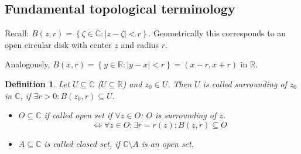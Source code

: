 \documentclass[a4paper,landscape,twocolumn]{article}
\newtheorem{defi}{Definition}
\newcommand\set[1]{\left\{#1\right\}}
\newcommand\abs[1]{\left|#1\right|}
\begin{document}
\subsection{Fundamental topological terminology}
%
Recall: $B(z, r) = \set{\zeta \in \mathbb C: \abs{z - \zeta} < r}$.
Geometrically this corresponds to an open circular disk with center $z$ and radius $r$.

Analogously, $B(x, r) = \set{y \in \mathbb R: \abs{y - x} < r} = (x-r, x+r)$
in $\mathbb R$.

\begin{defi}
  Let $U \subseteq \mathbb C$ ($U \subseteq \mathbb R$) and $z_0 \in U$.
  Then $U$ is called surrounding of $z_0$ in $\mathbb C$,
  if $\exists r > 0: B(z_0, r) \subseteq U$.
  \begin{itemize}
    \item
      $O \subseteq \mathbb C$ if called \emph{open set} if $\forall z \in O$:
      $O$ is surrounding of $z$.
      \[ \Leftrightarrow \forall z \in O: \exists r = r(z): B(z, r) \subseteq O \]
    \item
      $A \subseteq \mathbb C$ is called \emph{closed set}, if $\mathbb C \setminus A$
      is an open set.
  \end{itemize}
\end{defi}
\end{document}
